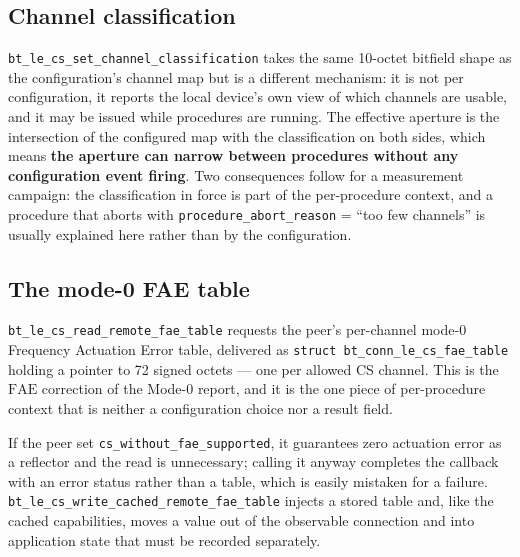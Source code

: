 \documentclass[11pt,a4paper]{article}
\newcommand{\code}[1]{\texttt{\small #1}}
\newcommand{\FAE}{\ensuremath{\mathrm{FAE}}}
\begin{document}
\subsection{Channel classification}

\code{bt\_\allowbreak{}le\_\allowbreak{}cs\_\allowbreak{}set\_\allowbreak{}channel\_\allowbreak{}classification} takes the same 10-octet bitfield shape as the
configuration's channel map but is a different mechanism: it is not per configuration, it reports the
local device's own view of which channels are usable, and it may be issued while procedures are
running. The effective aperture is the intersection of the configured map with the classification on
both sides, which means \textbf{the aperture can narrow between procedures without any configuration
event firing}. Two consequences follow for a measurement campaign: the classification in force is
part of the per-procedure context, and a procedure that aborts with
\code{procedure\_\allowbreak{}abort\_\allowbreak{}reason} = ``too few channels'' is usually explained here rather than by
the configuration.

\subsection{The mode-0 FAE table}
\label{sec:fae}

\code{bt\_\allowbreak{}le\_\allowbreak{}cs\_\allowbreak{}read\_\allowbreak{}remote\_\allowbreak{}fae\_\allowbreak{}table} requests the peer's per-channel mode-0 Frequency
Actuation Error table, delivered as \code{struct bt\_\allowbreak{}conn\_\allowbreak{}le\_\allowbreak{}cs\_\allowbreak{}fae\_\allowbreak{}table} holding a
pointer to 72 signed octets --- one per allowed CS channel. This is the $\FAE$ correction of the
Mode-0 report, and it is the one piece of per-procedure context that is neither a configuration
choice nor a result field.

If the peer set \code{cs\_\allowbreak{}without\_\allowbreak{}fae\_\allowbreak{}supported}, it guarantees zero actuation error as a
reflector and the read is unnecessary; calling it anyway completes the callback with an error status
rather than a table, which is easily mistaken for a failure.
\code{bt\_\allowbreak{}le\_\allowbreak{}cs\_\allowbreak{}write\_\allowbreak{}cached\_\allowbreak{}remote\_\allowbreak{}fae\_\allowbreak{}table} injects a stored table and, like the
cached capabilities, moves a value out of the observable connection and into application state that
must be recorded separately.
\end{document}

